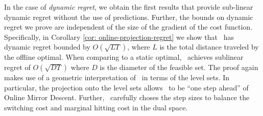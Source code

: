 In the case of \emph{dynamic regret}, we obtain the first results that provide sub-linear dynamic regret without the use of predictions.  Further, the bounds on dynamic regret we prove are independent of the size of the gradient of the cost function. %
Specifically, in Corollary \ref{cor: online-projection-regret} we show that \ourack\ has dynamic regret bounded by $O(\sqrt{LT})$, where $L$ is the total distance traveled by the offline optimal. When comparing to a static optimal, \ourack\ achieves sublinear regret of $O(\sqrt{DT})$ where $D$ is the diameter of the feasible set. The proof again makes use of a geometric interpretation of \ourack\ in terms of the level sets.  In particular, the projection onto the level sets allows \ourack\ to be ``one step ahead'' of Online Mirror Descent. Further, \ourack\ carefully choses the step sizes to balance the switching cost and marginal hitting cost in the dual space. 


  
